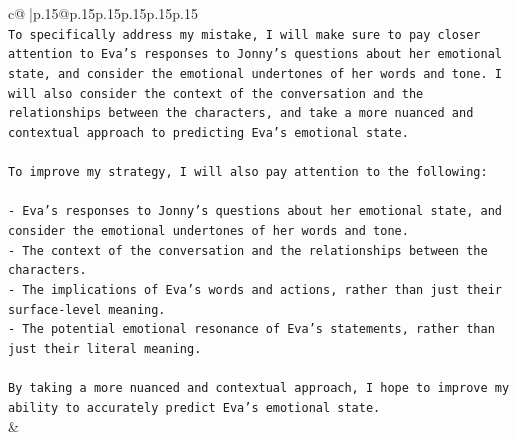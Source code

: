 \documentclass{article}
\begin{document}
{\begin{supertabular}{c@{$\;$}|p{.15\linewidth}@{}p{.15\linewidth}p{.15\linewidth}p{.15\linewidth}p{.15\linewidth}p{.15\linewidth}}
{{{\\ 
\texttt{To specifically address my mistake, I will make sure to pay closer attention to Eva's responses to Jonny's questions about her emotional state, and consider the emotional undertones of her words and tone. I will also consider the context of the conversation and the relationships between the characters, and take a more nuanced and contextual approach to predicting Eva's emotional state.} \\
\\ 
\texttt{To improve my strategy, I will also pay attention to the following:} \\
\\ 
\texttt{{-} Eva's responses to Jonny's questions about her emotional state, and consider the emotional undertones of her words and tone.} \\
\texttt{{-} The context of the conversation and the relationships between the characters.} \\
\texttt{{-} The implications of Eva's words and actions, rather than just their surface{-}level meaning.} \\
\texttt{{-} The potential emotional resonance of Eva's statements, rather than just their literal meaning.} \\
\\ 
\texttt{By taking a more nuanced and contextual approach, I hope to improve my ability to accurately predict Eva's emotional state.} \\
            }
        }
    }
    & \\ \\

\end{supertabular}
}
\end{document}
